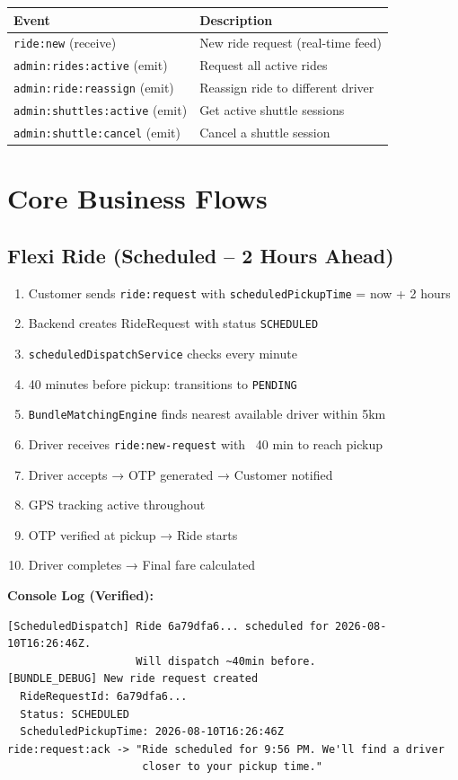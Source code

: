 \documentclass[11pt,a4paper]{article}
\begin{document}
\begin{longtable}{lp{8cm}}
\toprule
\textbf{Event} & \textbf{Description} \\
\midrule
\texttt{ride:new} (receive) & New ride request (real-time feed) \\
\texttt{admin:rides:active} (emit) & Request all active rides \\
\texttt{admin:ride:reassign} (emit) & Reassign ride to different driver \\
\texttt{admin:shuttles:active} (emit) & Get active shuttle sessions \\
\texttt{admin:shuttle:cancel} (emit) & Cancel a shuttle session \\
\bottomrule
\end{longtable}

\section{Core Business Flows}

\subsection{Flexi Ride (Scheduled -- 2 Hours Ahead)}
\begin{enumerate}
  \item Customer sends \texttt{ride:request} with \texttt{scheduledPickupTime} = now + 2 hours
  \item Backend creates RideRequest with status \texttt{SCHEDULED}
  \item \texttt{scheduledDispatchService} checks every minute
  \item 40 minutes before pickup: transitions to \texttt{PENDING}
  \item \texttt{BundleMatchingEngine} finds nearest available driver within 5km
  \item Driver receives \texttt{ride:new-request} with ~40 min to reach pickup
  \item Driver accepts → OTP generated → Customer notified
  \item GPS tracking active throughout
  \item OTP verified at pickup → Ride starts
  \item Driver completes → Final fare calculated
\end{enumerate}

\textbf{Console Log (Verified):}
\begin{lstlisting}
[ScheduledDispatch] Ride 6a79dfa6... scheduled for 2026-08-10T16:26:46Z.
                    Will dispatch ~40min before.
[BUNDLE_DEBUG] New ride request created
  RideRequestId: 6a79dfa6...
  Status: SCHEDULED
  ScheduledPickupTime: 2026-08-10T16:26:46Z
ride:request:ack -> "Ride scheduled for 9:56 PM. We'll find a driver
                     closer to your pickup time."
\end{lstlisting}
\end{document}
